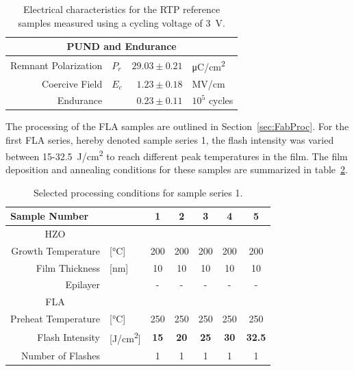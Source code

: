 \documentclass[11pt]{article}
\begin{document}
    \begin{table}[ht!]
        \centering
        \caption{Electrical characteristics for the RTP reference samples measured using a cycling voltage of \SI{3}{\volt}.}\label{tab:RTPref}
        \begin{tabular}{rlrl}
            \toprule
            \multicolumn{4}{c}{PUND and Endurance}\\\midrule
            Remnant Polarization & $P_r$ & $29.03 \pm 0.21$ & \si{\micro\coulomb/\centi\meter^2}\\
            Coercive Field & $E_c$ & $1.23 \pm 0.18$ & \si{\mega\volt/\centi\meter}\\
            Endurance & & $0.23 \pm 0.11$ & $10^5$ cycles\\\bottomrule
        \end{tabular}
    \end{table}

    The processing of the FLA samples are outlined in Section~\ref{sec:FabProc}. For the first FLA series, hereby denoted sample series 1, the flash intensity was varied between 15-\SI{32.5}{\joule/\centi\meter^2} to reach different peak temperatures in the film. The film deposition and annealing conditions for these samples are summarized in table~\ref{tab:FlashIntC}.

    \begin{table}[ht!]
        \centering
        \caption{Selected processing conditions for sample series 1.}\label{tab:FlashIntC}
        \begin{tabular}{rlccccc}
            \toprule
            \multicolumn{2}{l}{Sample Number} & 1 & 2 & 3 & 4 & 5 \\\midrule
            \multicolumn{1}{c}{HZO} & & & & & & \\
            Growth Temperature & [\si{\celsius}] & 200 & 200 & 200 & 200 & 200 \\
            Film Thickness & [\si{\nano\meter}] & 10 & 10 & 10 & 10 & 10 \\
            Epilayer & &-&-&-&-&-\\\midrule
            \multicolumn{1}{c}{FLA} & & & & & & \\
            Preheat Temperature & [\si{\celsius}] & 250 & 250 & 250 & 250 & 250 \\
            Flash Intensity & [\si{\joule/\centi\meter^2}] & \textbf{15} & \textbf{20} & \textbf{25} & \textbf{30} & \textbf{32.5} \\
            Number of Flashes & & 1 & 1 & 1 & 1 & 1 \\\bottomrule
        \end{tabular}
    \end{table}
\end{document}
